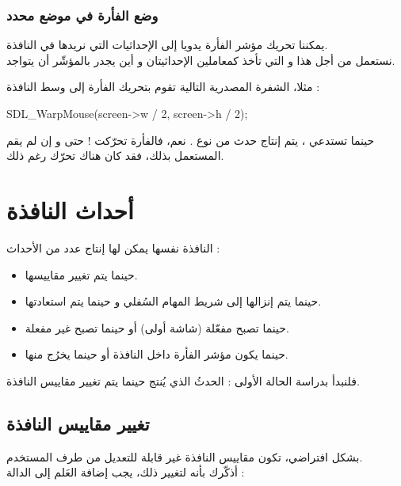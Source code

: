 \subsubsection{وضع الفأرة في موضع محدد}

يمكننا تحريك مؤشر الفأرة يدويا إلى الإحداثيات التي نريدها في النافذة.\\
نستعمل من أجل هذا
و التي تأخذ كمعاملين الإحداثيتان
و 
أين يجدر بالمؤشّر أن يتواجد.

مثلا، الشفرة المصدرية التالية تقوم بتحريك الفأرة إلى وسط النافذة :

\begin{Csource}
SDL_WarpMouse(screen->w / 2, screen->h / 2);
\end{Csource}

\begin{information}
حينما تستدعي
،
يتم إنتاج حدث من نوع
.
نعم، فالفأرة تحرّكت ! حتى و إن لم يقم المستعمل بذلك، فقد كان هناك تحرّك رغم ذلك.
\end{information}

\section{أحداث النافذة}

النافذة نفسها يمكن لها إنتاج عدد من الأحداث :

\begin{itemize}
	\item حينما يتم تغيير مقاييسها.
	\item حينما يتم إنزالها إلى شريط المهام السُفلي و حينما يتم استعادتها.
	\item حينما تصبح مفعّلة (شاشة أولى) أو حينما تصبح غير مفعلة.
	\item حينما يكون مؤشر الفأرة داخل النافذة أو حينما يخرُج منها.
\end{itemize}

فلنبدأ بدراسة الحالة الأولى : الحدثُ الذي يُنتج حينما يتم تغيير مقاييس النافذة.

\subsection{تغيير مقاييس النافذة}

بشكل افتراضي، تكون مقاييس النافذة غير قابلة للتعديل من طرف المستخدم.\\
أذكّرك بأنه لتغيير ذلك، يجب إضافة العَلم
إلى الدالة
 :

